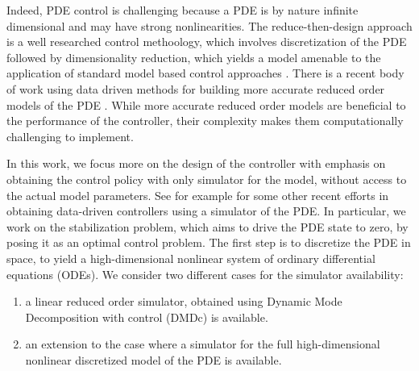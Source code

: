 \documentclass[letterpaper, 10 pt, conference]{ieeeconf}  %
\begin{document}
Indeed, PDE control is challenging because a PDE is by nature infinite dimensional and may have strong nonlinearities. 
The reduce-then-design approach is a well researched control methoology, which involves discretization of the PDE followed by dimensionality reduction, which yields a model amenable to the application of standard model based control approaches \cite{ %
leibfritz2007numerical, hovland2008explicit, barbagallo2009closed,sipp2016linear, %
tsolovikos2020estimation}. There is a recent body of work using data driven methods for building more accurate reduced order models of the PDE \cite{%
bhattacharya2021model, fresca2021comprehensive, kaiser2021data}. While more accurate reduced order models are beneficial to the performance of the controller, their complexity makes them computationally challenging to implement. 

In this work, we focus more on the design of the controller with emphasis on obtaining the control policy with only simulator for the model, without access to the actual model parameters. See for example \cite{duriez2017machine,blanchard2021bayesian,fan2020reinforcement, Garnieretal21} for some other recent efforts in obtaining data-driven controllers using a simulator of the PDE.   
In particular, we work on the stabilization problem, which aims to drive the PDE state to zero, by posing it as an optimal control problem. The first step is to discretize the PDE in space, to yield a high-dimensional nonlinear system of ordinary differential equations (ODEs). We consider two different cases for the simulator availability: 
\begin{enumerate}
    \item a linear reduced order simulator, obtained using Dynamic Mode Decomposition with control (DMDc) \cite{proctor2016dynamic,zhang-2024} is available.
    \item an extension to the case where a simulator for the full high-dimensional nonlinear discretized model of the PDE is available.
\end{enumerate}
\end{document}
